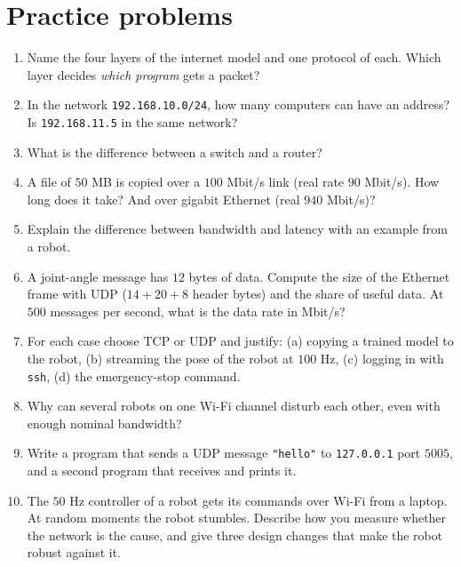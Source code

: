 \section*{Practice problems}
\begin{enumerate}[label=\textbf{\thechapter.\arabic*}]
  \item Name the four layers of the internet model and one protocol of each. Which layer decides \emph{which program} gets a packet?
  \item In the network \texttt{192.168.10.0/24}, how many computers can have an address? Is \texttt{192.168.11.5} in the same network?
  \item What is the difference between a switch and a router?
  \item A file of $50$ MB is copied over a $100$ Mbit/s link (real rate $90$ Mbit/s). How long does it take? And over gigabit Ethernet (real $940$ Mbit/s)?
  \item Explain the difference between bandwidth and latency with an example from a robot.
  \item A joint-angle message has $12$ bytes of data. Compute the size of the Ethernet frame with UDP ($14+20+8$ header bytes) and the share of useful data. At $500$ messages per second, what is the data rate in Mbit/s?
  \item For each case choose TCP or UDP and justify: (a) copying a trained model to the robot, (b) streaming the pose of the robot at $100$ Hz, (c) logging in with \texttt{ssh}, (d) the emergency-stop command.
  \item Why can several robots on one Wi-Fi channel disturb each other, even with enough nominal bandwidth?
  \item Write a program that sends a UDP message \texttt{"hello"} to \texttt{127.0.0.1} port $5005$, and a second program that receives and prints it.
  \item[\textbf{\thechapter.10}$\star$] The $50$ Hz controller of a robot gets its commands over Wi-Fi from a laptop. At random moments the robot stumbles. Describe how you measure whether the network is the cause, and give three design changes that make the robot robust against it.
\end{enumerate}
